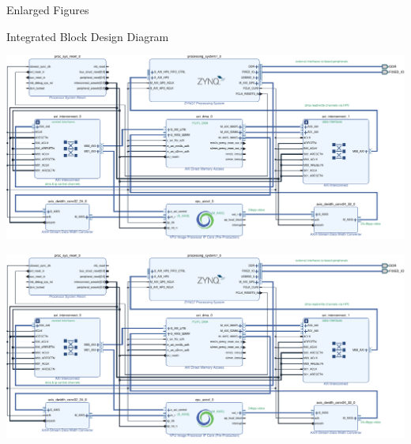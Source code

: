 \documentclass{matthijs}
\begin{document}
	\begin{appendices}
		\begin{hoofdstuk}{Enlarged Figures}
			\begin{paragraaf}{Integrated Block Design Diagram}
				\vspace{0.25cm}
				\centerline{\includegraphics[angle=90, origin=c, clip, trim=9.45cm 0 0 0, width=1.25\textwidth]{hw-block-diagram-crop-asset.pdf}}
				\clearpage
				\centerline{\includegraphics[angle=90, origin=c, clip, trim=0 0 9.45cm 0, width=1.25\textwidth]{hw-block-diagram-crop-asset.pdf}}
			\end{paragraaf}
		\end{hoofdstuk}
	\end{appendices}

	\clearpage
	\thispagestyle{empty}
	\addtocounter{page}{-1}
	\
	\clearpage
\end{document}
